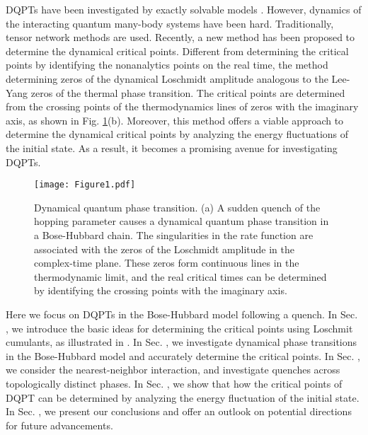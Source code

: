 \documentclass[%
reprint,
superscriptaddress,
amsmath,amssymb,
aps,
pra,
floatfix,
]{revtex4-1}
\begin{document}
DQPTs have been investigated by exactly solvable models \cite{heyl2013,schmitt2015,vajna2015}. However, dynamics of the interacting quantum many-body systems have been hard. Traditionally, tensor network methods are used. Recently, a new method \cite{peotta2021,brange2022} has been proposed to determine the dynamical critical points. Different from determining the critical points by identifying the nonanalytics points on the real time, the method determining zeros of the dynamical Loschmidt amplitude analogous to the Lee-Yang zeros\cite{yang1952,lee1952,brange2023} of the thermal phase transition. The critical points are determined from the crossing points of the thermodynamics lines of zeros with the imaginary axis, as shown in Fig. \ref{fig:scheme}(b). Moreover, this method offers a viable approach to determine the dynamical critical points by analyzing the energy fluctuations of the initial state. As a result, it becomes a promising avenue for investigating DQPTs.

\begin{figure}[htbp]
	\texttt{[image: Figure1.pdf]}
	\caption{ Dynamical quantum phase transition. (a) A sudden quench of the hopping parameter causes a dynamical quantum phase transition in a Bose-Hubbard chain. The singularities in the rate function are associated with the zeros of the Loschmidt amplitude in the complex-time plane. These zeros form continuous lines in the thermodynamic limit, and the real critical times can be determined by identifying the crossing points with the imaginary axis. 
	}
	\label{fig:scheme}	
\end{figure}

Here we focus on DQPTs in the Bose-Hubbard model following a quench. In Sec. \uppercase\expandafter{}, we introduce the basic ideas for determining the critical points using Loschmit cumulants, as illustrated in  \cite{peotta2021}. In Sec. \uppercase\expandafter{}, we investigate dynamical phase transitions in the Bose-Hubbard model and accurately determine the critical points.
In Sec. \uppercase\expandafter{}, we consider the nearest-neighbor interaction, and investigate quenches across topologically distinct phases. In Sec. \uppercase\expandafter{}, we show that how the critical points of DQPT can be determined by analyzing the energy fluctuation of the initial state. In Sec. \uppercase\expandafter{}, we present our conclusions and offer an outlook on potential directions for future advancements.
\end{document}
